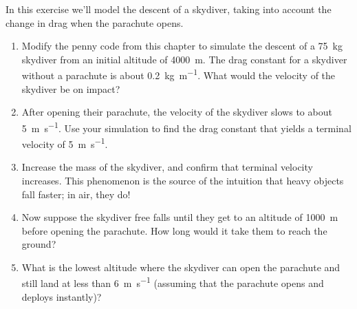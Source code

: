 \begin{ex}

In this exercise we'll model the descent of a skydiver, taking into account the change in drag when the parachute opens.

\begin{enumerate}

\item Modify the penny code from this chapter to simulate the descent of a \SI{75}{\kilogram} skydiver from an initial altitude of \SI{4000}{\meter}.
The drag constant for a skydiver without a parachute is about \SI{0.2}{\kilogram \per \meter}.
What would the velocity of the skydiver be on impact?

\item After opening their parachute, the velocity of the skydiver slows to about \SI{5}{\meter\per\second}.  Use your simulation to find the drag constant that yields a terminal velocity of \SI{5}{\meter\per\second}.

\item Increase the mass of the skydiver, and confirm that terminal velocity increases.  This phenomenon is the source of the intuition that heavy objects fall faster; in air, they do!

\item Now suppose the skydiver free falls until they get to an altitude of \SI{1000}{\meter} before opening the parachute.  How long would it take them to reach the ground?

\item What is the lowest altitude where the skydiver can open the parachute and still land at less than \SI{6}{\meter\per\second} (assuming that the parachute opens and deploys instantly)?

\end{enumerate}


\end{ex}



